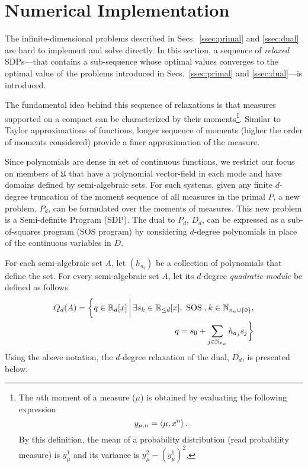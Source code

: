   \section{Numerical Implementation}
\label{sec:implementation}
  The infinite-dimensional problems described in Secs.~\ref{ssec:primal} and \ref{ssec:dual} are hard to implement and solve directly. In this section, a sequence of {\em relaxed} SDPs---that contains a sub-sequence whose optimal values converges to the optimal value of the problems introduced in Secs.~\ref{ssec:primal} and \ref{ssec:dual}---is introduced.
  \par
  The fundamental idea behind this sequence of relaxations is that measures supported on a compact can be characterized by their moments\footnote{The $n$th moment of a measure ($\mu$) is obtained by evaluating the following expression
  $$y_{\mu,n}=\left\langle \mu,x^n\right\rangle.$$
  By this definition, the mean of a probability distribution (read probability measure) is $y_\mu^1$ and its variance is $y_{\mu}^2-(y_{\mu}^1)^2$.}. Similar to Taylor approximations of functions, longer sequence of moments (higher the order of moments considered) provide a finer approximation of the measure.
  \par
  Since polynomials are dense in set of continuous functions, we restrict our focus on members of $\mathfrak{U}$ that have a polynomial vector-field in each mode and have domains defined by semi-algebraic sets. For such systems, given any finite $d$-degree truncation of the moment sequence of all measures in the primal $P$, a new problem, $P_d$, can be formulated over the moments of measures. This new problem is a Semi-definite Program (SDP). The dual to $P_d$, $D_d$, can be expressed as a sub-of-squares program (SOS program) by considering $d$-degree polynomials in place of the continuous variables in $D$.
  \par
  For each semi-algebraic set $A$, let $(h_{a_i})$ be a collection of polynomials that define the set. For every semi-algebraic set $A$, let its $d$-degree {\em quadratic module} be defined as follows
  \begin{align}
  \begin{split}
  Q_d(A)=\bigg\{q\in \mathbb{R}_d[x]\,\bigg|\, \exists s_k\in \mathbb{R}_{\le d}[x], \text{ SOS },k\in \mathbb{N}_{n_{a}\cup\{0\}},\\
  q=s_0+\sum_{j\in \mathbb{N}_{n_{a}}}h_{a_j}s_j\bigg\}
  \end{split}
  \end{align}
  Using the above notation, the $d$-degree relaxation of the dual, $D_d$, is presented below.
